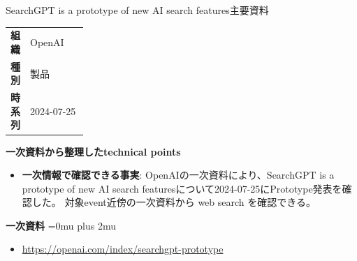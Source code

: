 \begin{technicalnote}{SearchGPT is a prototype of new AI search features}{主要資料}
\begingroup
\begin{tabularx}{\linewidth}{@{}>{\bfseries}p{0.22\linewidth}X@{}}
組織 & OpenAI \\
種別 & 製品 \\
時系列 & 2024-07-25 \\
\end{tabularx}
\smallskip
{\bfseries 一次資料から整理したtechnical points}
\begin{itemize}[leftmargin=1.5em,itemsep=0.35em]
\item \textbf{一次情報で確認できる事実}: OpenAIの一次資料により、SearchGPT is a prototype of new AI search featuresについて2024-07-25にPrototype発表を確認した。 対象event近傍の一次資料から web search を確認できる。
\end{itemize}
\begin{minipage}{\linewidth}
\begin{samepage}
{\bfseries 一次資料}
\begingroup\sloppy
\Urlmuskip=0mu plus 2mu\relax
\begin{itemize}[leftmargin=1.5em,itemsep=0.25em]
\item {\scriptsize\url{https://openai.com/index/searchgpt-prototype}}
\end{itemize}
\endgroup
\end{samepage}
\end{minipage}
\endgroup
\end{technicalnote}
\medskip

